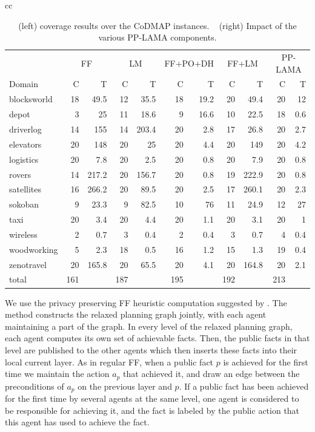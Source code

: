 \documentclass[letterpaper]{article}
\theoremstyle{definition}
\begin{document}
\begin{table}
\begin{tabular}{cc}
\begin{minipage}{.55\textwidth}
{\begin{tabular}{l||r|r||r|r||r|r||r|r||r|r}
			&\multicolumn{2}{c|}{FF}&\multicolumn{2}{c||}{LM}&\multicolumn{2}{c||}{FF+PO+DH}&\multicolumn{2}{c||}{FF+LM}&\multicolumn{2}{c}{PP-LAMA} 		\\
Domain&C&T&C&T&C&T&C&T&C&T \\ \hline
blocksworld	&18&49.5	&12&35.5	&18&19.2	&20&49.4	&20&12	\\
depot	&3&25	&11&18.6	&9&16.6	&10&22.5	&18&0.6	\\
driverlog	&14&155	&14&203.4	&20&2.8	&17&26.8	&20&2.7	\\
elevators	&20&148	&20&25	&20&4.4	&20&149	&20&4.2	\\
logistics	&20&7.8	&20&2.5	&20&0.8	&20&7.9	&20&0.8	\\
rovers	&14&217.2	&20&156.7	&20&0.8	&19&222.9	&20&0.8	\\
satellites	&16&266.2	&20&89.5	&20&2.5	&17&260.1	&20&2.3	\\
sokoban	&9&23.3	&9&82.5	&10&76	&11&24.9	&12&27	\\
taxi	&20&3.4	&20&4.4	&20&1.1	&20&3.1	&20&1	\\
wireless	&2&0.7	&3&0.4	&2&0.4	&3&0.7	&4&0.4	\\
woodworking	&5&2.3	&18&0.5	&16&1.2	&15&1.3	&19&0.4	\\
zenotravel	&20&165.8	&20&65.5	&20&4.1	&20&164.8	&20&2.1	\\ \hline
total	&161&	&187&	&195&	&192&	& 213&	\\
\end{tabular}
}
    \end{minipage}
\end{tabular}
\caption{(left) coverage results over the CoDMAP instances. ~ (right) Impact of the various PP-LAMA components.}
\label{tab:results}
\end{table}


We use the privacy preserving FF heuristic computation suggested by \cite{vstolba2015admissible}. The method constructs the relaxed planning graph jointly, with each agent maintaining a part of the graph. In every level of the relaxed planning graph, each agent computes its own set of achievable facts. Then, the public facts in that level are published to the other agents which then inserts these facts into their local current layer. As in regular FF, when
a public fact $p$ is achieved for the first time we maintain the action $a_p$ that achieved it, and draw an edge between the preconditions of $a_p$ on the previous layer and $p$. If a public fact has been achieved for the first time by several agents at the same level, one agent is considered to be responsible for achieving it, and the fact is labeled by the public action that this agent has used to achieve the fact.
\end{document}
